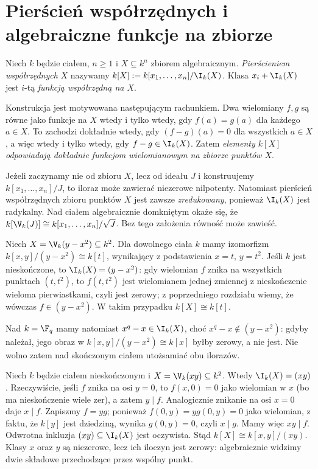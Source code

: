 \section{Pierścień współrzędnych i algebraiczne funkcje na zbiorze}

\begin{definicja}
Niech $k$ będzie ciałem, $n\ge1$ i $X\subseteq k^n$ zbiorem
algebraicznym. \emph{Pierścieniem współrzędnych} $X$ nazywamy
$k[X]:=k[x_1,\dots,x_n]/\I_k(X)$.
Klasa $x_i+\I_k(X)$ jest $i$-tą \emph{funkcją współrzędną na $X$}.
\end{definicja}

Konstrukcja jest motywowana następującym rachunkiem. Dwa wielomiany
$f,g$ są równe jako funkcje na $X$ wtedy i tylko wtedy, gdy
$f(a)=g(a)$ dla każdego $a\in X$. To zachodzi dokładnie wtedy,
gdy $(f-g)(a)=0$ dla wszystkich $a\in X$, a więc wtedy i tylko wtedy,
gdy $f-g\in\I_k(X)$. Zatem \emph{elementy $k[X]$ odpowiadają dokładnie
funkcjom wielomianowym na zbiorze punktów $X$}.

\begin{uwaga}
Jeżeli zaczynamy nie od zbioru $X$, lecz od ideału $J$ i konstruujemy
$k[x_1,\dots,x_n]/J$, to iloraz może zawierać niezerowe nilpotenty.
Natomiast pierścień współrzędnych zbioru punktów $X$ jest zawsze
\emph{zredukowany}, ponieważ $\I_k(X)$ jest radykalny.
Nad ciałem algebraicznie domkniętym okaże się, że
$k[\V_k(J)]\cong k[x_1,\dots,x_n]/\sqrt J$.
Bez tego założenia równość może zawieść.
\end{uwaga}

\begin{przyklad}[Parabola]
Niech $X=\V_k(y-x^2)\subseteq k^2$.
Dla dowolnego ciała $k$ mamy izomorfizm
$k[x,y]/(y-x^2)\cong k[t]$, wynikający z podstawienia
$x=t$, $y=t^2$. Jeśli $k$ jest nieskończone, to
$\I_k(X)=(y-x^2)$: gdy wielomian $f$ znika na wszystkich
punktach $(t,t^2)$, to $f(t,t^2)$ jest wielomianem jednej
zmiennej z nieskończenie wieloma pierwiastkami, czyli jest zerowy;
z poprzedniego rozdziału wiemy, że wówczas $f\in(y-x^2)$.
W takim przypadku $k[X]\cong k[t]$.

Nad $k=\F_q$ mamy natomiast $x^q-x\in\I_k(X)$,
choć $x^q-x\notin(y-x^2)$: gdyby należał, jego obraz w
$k[x,y]/(y-x^2)\cong k[x]$ byłby zerowy, a nie jest.
Nie wolno zatem nad skończonym ciałem utożsamiać obu ilorazów.
\end{przyklad}

\begin{przyklad}
Niech $k$ będzie ciałem nieskończonym i
$X=\V_k(xy)\subseteq k^2$. Wtedy $\I_k(X)=(xy)$.
Rzeczywiście, jeśli $f$ znika na osi $y=0$, to
$f(x,0)=0$ jako wielomian w $x$ (bo ma nieskończenie wiele zer),
a zatem $y\mid f$. Analogicznie znikanie na osi $x=0$
daje $x\mid f$. Zapiszmy $f=yg$; ponieważ $f(0,y)=yg(0,y)=0$
jako wielomian, z faktu, że $k[y]$ jest dziedziną, wynika
$g(0,y)=0$, czyli $x\mid g$. Mamy więc $xy\mid f$.
Odwrotna inkluzja $(xy)\subseteq\I_k(X)$ jest oczywista.
Stąd $k[X]\cong k[x,y]/(xy)$. Klasy $x$ oraz $y$
są niezerowe, lecz ich iloczyn jest zerowy: algebraicznie
widzimy dwie składowe przechodzące przez wspólny punkt.
\end{przyklad}

